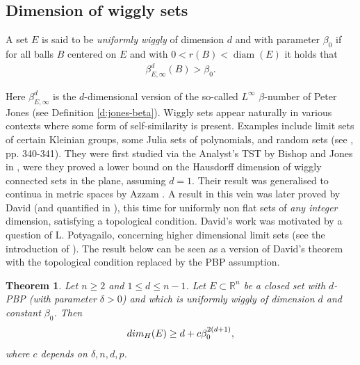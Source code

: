\documentclass[11pt,reqno]{amsart}
\DeclareMathOperator{\diam}{diam}
\newtheorem{theorem}{Theorem}[section]
\theoremstyle{definition}
\theoremstyle{remark}
\numberwithin{equation}{section}
\newcommand{\R}{\mathbb{R}}
\theoremstyle{theorem}
\theoremstyle{definition}
\theoremstyle{remark}
\numberwithin{equation}{section}
\begin{document}
	\subsection{Dimension of wiggly sets}
	
		A  set $E$ is said to be \textit{uniformly wiggly} of dimension $d$ and with parameter $\beta_0$ if for all balls $B$ centered on $E$ and with $0<r(B)<\diam(E)$ it holds that
		\begin{align}\label{e:beta-jones}
	\beta_{E, \infty}^d(B) > \beta_0.
		\end{align}

		Here $\beta_{E, \infty}^d$ is the $d$-dimensional version of the so-called $L^\infty$ $\beta$-number of Peter Jones \cite{jones1990rectifiable} (see Definition \ref{d:jones-beta}). Wiggly sets appear naturally in various contexts where some form of self-similarity is present. Examples include limit sets of certain Kleinian groups, some Julia sets of polynomials, and random sets (see \cite{bishop2017fractals}, pp. 340-341).  They were first studied via the Analyst's TST by Bishop and Jones in \cite{bishop1997wiggly}, were they proved a lower bound on the Hausdorff dimension of wiggly connected sets in the plane, assuming $d=1$. Their result was generalised to continua in metric spaces by Azzam \cite{azzam2015hausdorff}. A result in this vein was later proved by David \cite{david2004hausdorff} (and quantified in \cite{villa2019higher}), this time for uniformly non flat sets of \textit{any integer} dimension, satisfying a topological condition. David's work was motivated by a question of L. Potyagailo, concerning higher dimensional limit sets (see the introduction of \cite{david2004hausdorff}). The result below can be seen as a version of David's theorem with the topological condition replaced by the PBP assumption.

	\begin{theorem}\label{t:corollary}
		Let $n \geq 2$ and $1 \leq d \leq n-1$. Let $E \subset \R^n$ be a closed set with $d$-PBP \textup{(}with parameter $\delta>0$\textup{)} and which is uniformly wiggly of dimension $d$ and constant $\beta_0$. Then 
		\begin{equation}\label{e:wiggly-dim}
		{\rm dim}_H(E) \geq d + c\beta_0^{2(d+1)},
		\end{equation}
		where $c$ depends on $\delta, n,d,p$.
	\end{theorem}
	
\end{document}
